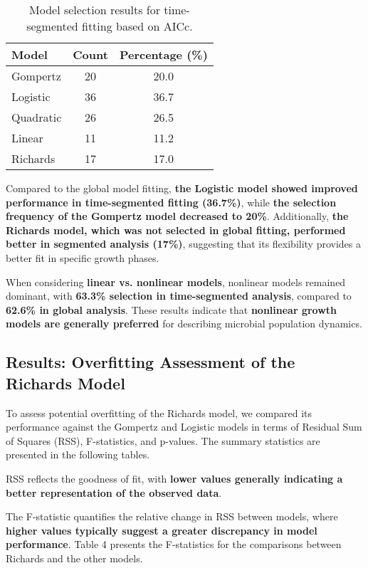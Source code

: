 \documentclass{article}
\begin{document}
\begin{table}[h]
    \centering
    \caption{Model selection results for time-segmented fitting based on AICc.}
    \label{tab:time_segmented_fit}
    \begin{tabular}{lcc}
        \hline
        \textbf{Model} & \textbf{Count} & \textbf{Percentage (\%)} \\
        \hline
        Gompertz  & 20   & 20.0  \\
        Logistic  & 36   & 36.7  \\
        Quadratic & 26   & 26.5  \\
        Linear    & 11   & 11.2  \\
        Richards  & 17   & 17.0  \\
        \hline
    \end{tabular}
\end{table}

Compared to the global model fitting, \textbf{the Logistic model showed improved performance in time-segmented fitting (36.7\%)}, while \textbf{the selection frequency of the Gompertz model decreased to 20\%}. Additionally, \textbf{the Richards model, which was not selected in global fitting, performed better in segmented analysis (17\%)}, suggesting that its flexibility provides a better fit in specific growth phases.

When considering \textbf{linear vs. nonlinear models}, nonlinear models remained dominant, with \textbf{63.3\% selection in time-segmented analysis}, compared to \textbf{62.6\% in global analysis}. These results indicate that \textbf{nonlinear growth models are generally preferred} for describing microbial population dynamics.

\subsection{Results: Overfitting Assessment of the Richards Model}

To assess potential overfitting of the Richards model, we compared its performance against the Gompertz and Logistic models in terms of Residual Sum of Squares (RSS), F-statistics, and p-values. The summary statistics are presented in the following tables.

RSS reflects the goodness of fit, with \textbf{lower values generally indicating a better representation of the observed data}.

The F-statistic quantifies the relative change in RSS between models, where \textbf{higher values typically suggest a greater discrepancy in model performance}. Table 4 presents the F-statistics for the comparisons between Richards and the other models.
\end{document}
